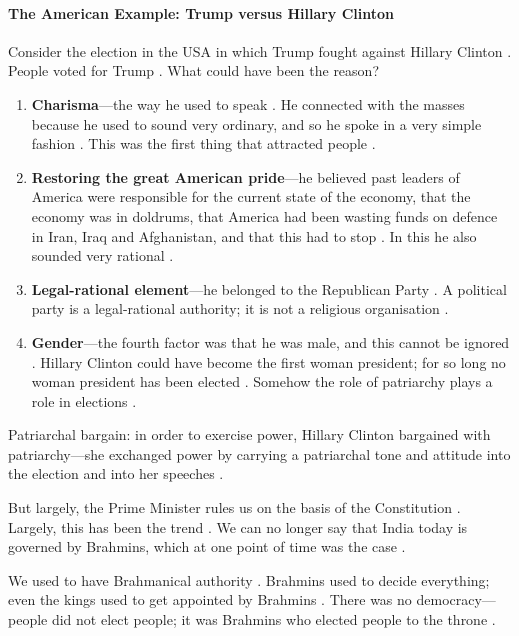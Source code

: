 \paragraph{The American Example: Trump versus Hillary Clinton}
Consider the election in the USA in which Trump fought against Hillary Clinton . People voted for Trump . What could have been the reason? 
\begin{enumerate}
    \item \textbf{Charisma}---the way he used to speak . He connected with the masses because he used to sound very ordinary, and so he spoke in a very simple fashion . This was the first thing that attracted people .
    \item \textbf{Restoring the great American pride}---he believed past leaders of America were responsible for the current state of the economy, that the economy was in doldrums, that America had been wasting funds on defence in Iran, Iraq and Afghanistan, and that this had to stop . In this he also sounded very rational .
    \item \textbf{Legal-rational element}---he belonged to the Republican Party . A political party is a legal-rational authority; it is not a religious organisation .
    \item \textbf{Gender}---the fourth factor was that he was male, and this cannot be ignored . Hillary Clinton could have become the first woman president; for so long no woman president has been elected . Somehow the role of patriarchy plays a role in elections .
\end{enumerate}

\begin{KeyConcept}
Patriarchal bargain: in order to exercise power, Hillary Clinton bargained with patriarchy---she exchanged power by carrying a patriarchal tone and attitude into the election and into her speeches .
\end{KeyConcept}

But largely, the Prime Minister rules us on the basis of the Constitution . Largely, this has been the trend . We can no longer say that India today is governed by Brahmins, which at one point of time was the case .

\begin{ExampleBox}
We used to have Brahmanical authority . Brahmins used to decide everything; even the kings used to get appointed by Brahmins . There was no democracy---people did not elect people; it was Brahmins who elected people to the throne .
\end{ExampleBox}

